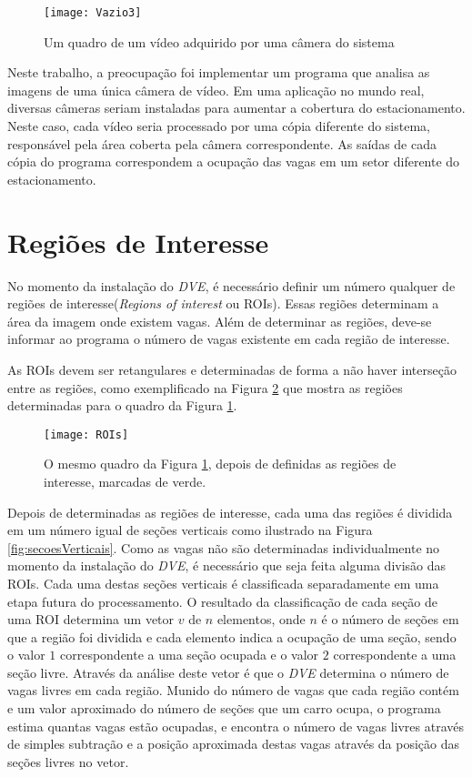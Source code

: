 \begin{figure}[!ht]
	\centering
	\texttt{[image: Vazio3]}
	\caption{Um quadro de um vídeo adquirido por uma câmera do sistema}
	\label{fig:aquisicao}
	\centering
\end{figure}

Neste trabalho, a preocupação foi implementar um programa que analisa as imagens de uma única câmera de vídeo. Em uma aplicação no mundo real, diversas câmeras seriam instaladas para aumentar a cobertura do estacionamento. Neste caso, cada vídeo seria processado por uma cópia diferente do sistema, responsável pela área coberta pela câmera correspondente. As saídas de cada cópia do programa correspondem a ocupação das vagas em um setor diferente do estacionamento.

\section{Regiões de Interesse}\label{sec:ROIs}

No momento da instalação do \textit{DVE}, é necessário definir um número qualquer de regiões de interesse(\textit{Regions of interest} ou ROIs). Essas regiões determinam a área da imagem onde existem vagas. Além de determinar as regiões, deve-se informar ao programa o número de vagas existente em cada região de interesse.

As ROIs devem ser retangulares e determinadas de forma a não haver interseção entre as regiões, como exemplificado na Figura \ref{fig:ROIs} que mostra as regiões determinadas para o quadro da Figura \ref{fig:aquisicao}.

\begin{figure}
	\centering
	\texttt{[image: ROIs]}
	\caption{O mesmo quadro da Figura \ref{fig:aquisicao}, depois de definidas as regiões de interesse, marcadas de verde.}
	\label{fig:ROIs}
	\centering
\end{figure}

Depois de determinadas as regiões de interesse, cada uma das regiões é dividida em um número igual de seções verticais como ilustrado na Figura \ref{fig:secoesVerticais}. Como as vagas não são determinadas individualmente no momento da instalação do \textit{DVE}, é necessário que seja feita alguma divisão das ROIs. Cada uma destas seções verticais é classificada separadamente em uma etapa futura do processamento. O resultado da classificação de cada seção de uma ROI determina um vetor $v$ de $n$ elementos, onde $n$ é o número de seções em que a região foi dividida e cada elemento indica a ocupação de uma seção, sendo o valor $1$ correspondente a uma seção ocupada e o valor $2$ correspondente a uma seção livre. Através da análise deste vetor é que o \textit{DVE} determina o número de vagas livres em cada região. Munido do número de vagas que cada região contém e um valor aproximado do número de seções que um carro ocupa, o programa estima quantas vagas estão ocupadas, e encontra o número de vagas livres através de simples subtração e a posição aproximada destas vagas através da posição das seções livres no vetor.

